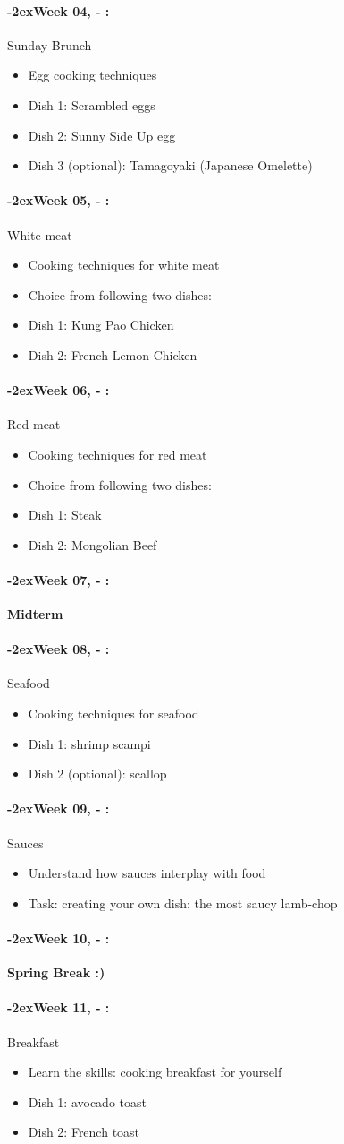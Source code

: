 \documentclass[11pt]{article}
\newcommand{\week}[1]{%
  \paragraph*{\kern-2ex\quad #1, \syldate{\today} - \AdvanceDate[4]\syldate{\today}:}%
  \ifdim\wd1=\wd\MONDAY
    \AdvanceDate[7]
  \else
    \AdvanceDate[7]
  \fi%
}
\begin{document}
\week{Week 04} Sunday Brunch 
\begin{itemize}
\item Egg cooking techniques 
\item Dish 1: Scrambled eggs 
\item Dish 2: Sunny Side Up egg 
\item Dish 3 (optional): Tamagoyaki (Japanese Omelette)
\end{itemize}

\week{Week 05} White meat
\begin{itemize}
\item Cooking techniques for white meat
\item Choice from following two dishes:
\item Dish 1: Kung Pao Chicken 
\item Dish 2: French Lemon Chicken
\end{itemize}

\week{Week 06} Red meat
\begin{itemize}
\item Cooking techniques for red meat
\item Choice from following two dishes:
\item Dish 1: Steak
\item Dish 2: Mongolian Beef 
\end{itemize}

\week{Week 07}  \textbf{Midterm}

\week{Week 08} Seafood 
\begin{itemize}
\item Cooking techniques for seafood 
\item Dish 1: shrimp scampi 
\item Dish 2 (optional): scallop 
\end{itemize}

\week{Week 09} Sauces
\begin{itemize}
\item Understand how sauces interplay with food
\item Task: creating your own dish: the most saucy lamb-chop
\end{itemize}

\week{Week 10} \textbf{Spring Break :)}

\week{Week 11} Breakfast
\begin{itemize}
\item Learn the skills: cooking breakfast for yourself
\item Dish 1: avocado toast
\item Dish 2: French toast
\end{itemize}
\end{document}
